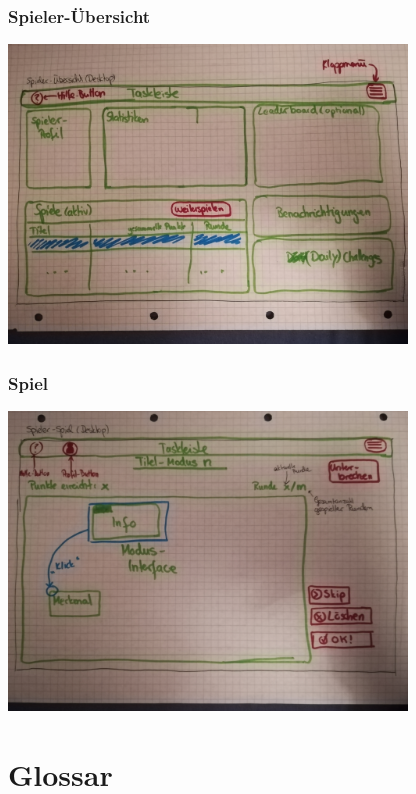 \documentclass[a4paper]{scrreprt}
\begin{document}
    \subsection{Spieler-Übersicht}
    \label{fig:Spieler-Übersicht}
    \centering
    \includegraphics[width=400px]{../pictures/5_Spieler.jpg}

    \subsection{Spiel}
    \centering
    \includegraphics[width=400px]{../pictures/6_Spiel.jpg}

    \clearpage


    \chapter{Glossar}

    \printglossary
\end{document}
